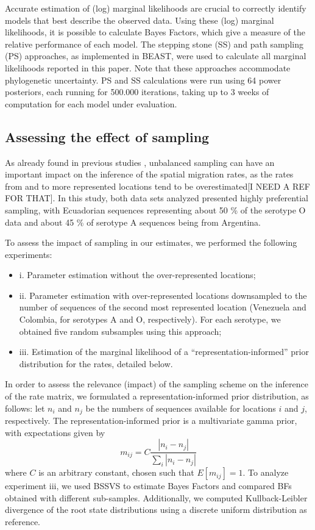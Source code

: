 \documentclass[10pt]{article}
\begin{document}
Accurate estimation of (log) marginal likelihoods are crucial to correctly identify models that best describe the observed data. 
Using these (log) marginal likelihoods, it is possible to calculate Bayes Factors, which give a measure of the relative performance of each model. 
The stepping stone (SS) and path sampling (PS) approaches, as implemented in BEAST, were used  to calculate all marginal likelihoods reported in this paper.
Note that these approaches accommodate phylogenetic uncertainty.
PS and SS calculations were run using 64 power posteriors, each running for 500.000 iterations, taking up to 3 weeks of computation for each model under evaluation.




\subsection*{Assessing the effect of sampling}

As already found in previous studies \cite{Faria2012, Lemey2013}, unbalanced sampling can have an important impact on the inference of the spatial migration rates, as the rates from and to more represented locations tend to be overestimated[I NEED A REF FOR THAT].
In this study, both data sets analyzed presented highly preferential sampling, with Ecuadorian sequences representing about 50 \% of the serotype O data and about 45 \% of serotype A sequences being from Argentina.

To assess the impact of sampling in our estimates, we performed the following experiments:
\begin{itemize}
 \item i. Parameter estimation without the over-represented locations;
 \item ii. Parameter estimation with over-represented locations downsampled to the number of sequences of the second most represented location (Venezuela and Colombia, for serotypes A and O, respectively). For each serotype, we obtained five random subsamples using this approach;
 \item iii. Estimation of the marginal likelihood of a ``representation-informed'' prior distribution for the rates, detailed below.
\end{itemize}

In order to assess the relevance (impact) of the sampling scheme on the inference of the rate matrix, we formulated a representation-informed prior distribution, as follows: let $n_i$ and $n_j$ be the numbers of sequences available for locations $i$ and $j$, respectively.
 The representation-informed prior is a multivariate gamma prior, with expectations given by
\begin{equation}
 m_{ij}=C\frac{|n_i-n_j|}{\sum_i|n_i-n_j|}
\end{equation}
where $C$ is an arbitrary constant, chosen such that $E[m_{ij}]=1$.
To analyze experiment iii, we used BSSVS to estimate Bayes Factors and compared BFs obtained with different sub-samples.
Additionally, we computed Kullback-Leibler divergence \cite{KL,roots} of the root state distributions using a discrete uniform distribution as reference. 
\end{document}
